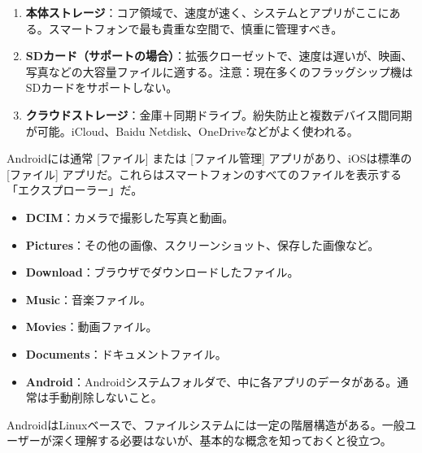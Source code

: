 


\begin{enumerate}
  \item \textbf{本体ストレージ}：コア領域で、速度が速く、システムとアプリがここにある。スマートフォンで最も貴重な空間で、慎重に管理すべき。
  \item \textbf{SDカード（サポートの場合）}：拡張クローゼットで、速度は遅いが、映画、写真などの大容量ファイルに適する。注意：現在多くのフラッグシップ機はSDカードをサポートしない。
  \item \textbf{クラウドストレージ}：金庫＋同期ドライブ。紛失防止と複数デバイス間同期が可能。iCloud、Baidu Netdisk、OneDriveなどがよく使われる。
\end{enumerate}


Androidには通常 [ファイル] または [ファイル管理] アプリがあり、iOSは標準の [ファイル] アプリだ。これらはスマートフォンのすべてのファイルを表示する「エクスプローラー」だ。


\begin{itemize}
  \item \textbf{DCIM}：カメラで撮影した写真と動画。
  \item \textbf{Pictures}：その他の画像、スクリーンショット、保存した画像など。
  \item \textbf{Download}：ブラウザでダウンロードしたファイル。
  \item \textbf{Music}：音楽ファイル。
  \item \textbf{Movies}：動画ファイル。
  \item \textbf{Documents}：ドキュメントファイル。
  \item \textbf{Android}：Androidシステムフォルダで、中に各アプリのデータがある。通常は手動削除しないこと。
\end{itemize}


AndroidはLinuxベースで、ファイルシステムには一定の階層構造がある。一般ユーザーが深く理解する必要はないが、基本的な概念を知っておくと役立つ。

